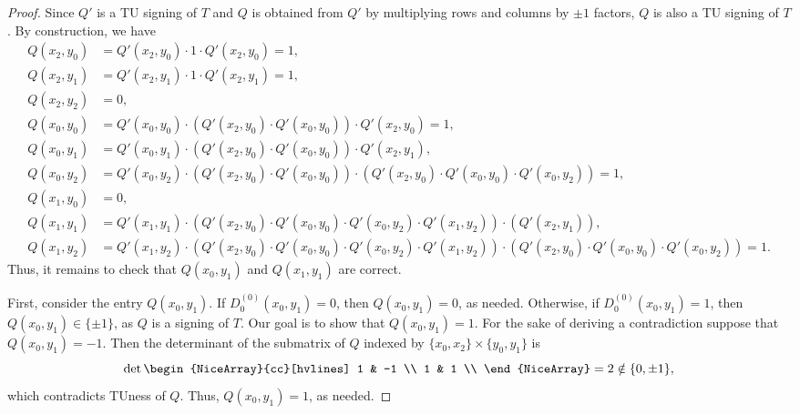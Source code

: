 \documentclass{article}
\theoremstyle{definition}
\begin{document}
\begin{proof}
    Since $Q'$ is a TU signing of $T$ and $Q$ is obtained from $Q'$ by multiplying rows and columns by $\pm 1$ factors, $Q$ is also a TU signing of $T$. By construction, we have
    \begin{align*}
        Q (x_{2}, y_{0}) &= Q' (x_{2}, y_{0}) \cdot 1 \cdot Q' (x_{2}, y_{0}) = 1, \\
        Q (x_{2}, y_{1}) &= Q' (x_{2}, y_{1}) \cdot 1 \cdot Q' (x_{2}, y_{1}) = 1, \\
        Q (x_{2}, y_{2}) &= 0, \\
        Q (x_{0}, y_{0}) &= Q' (x_{0}, y_{0}) \cdot (Q' (x_{2}, y_{0}) \cdot Q' (x_{0}, y_{0})) \cdot Q' (x_{2}, y_{0}) = 1, \\
        Q (x_{0}, y_{1}) &= Q' (x_{0}, y_{1}) \cdot (Q' (x_{2}, y_{0}) \cdot Q' (x_{0}, y_{0})) \cdot Q' (x_{2}, y_{1}), \\
        Q (x_{0}, y_{2}) &= Q' (x_{0}, y_{2}) \cdot (Q' (x_{2}, y_{0}) \cdot Q' (x_{0}, y_{0})) \cdot (Q' (x_{2}, y_{0}) \cdot Q' (x_{0}, y_{0}) \cdot Q' (x_{0}, y_{2})) = 1, \\
        Q (x_{1}, y_{0}) &= 0, \\
        Q (x_{1}, y_{1}) &= Q' (x_{1}, y_{1}) \cdot (Q' (x_{2}, y_{0}) \cdot Q' (x_{0}, y_{0}) \cdot Q' (x_{0}, y_{2}) \cdot Q' (x_{1}, y_{2})) \cdot (Q' (x_{2}, y_{1})), \\
        Q (x_{1}, y_{2}) &= Q' (x_{1}, y_{2}) \cdot (Q' (x_{2}, y_{0}) \cdot Q' (x_{0}, y_{0}) \cdot Q' (x_{0}, y_{2}) \cdot Q' (x_{1}, y_{2})) \cdot (Q' (x_{2}, y_{0}) \cdot Q' (x_{0}, y_{0}) \cdot Q' (x_{0}, y_{2})) = 1.
    \end{align*}
    Thus, it remains to check that $Q (x_{0}, y_{1})$ and $Q (x_{1}, y_{1})$ are correct.

    First, consider the entry $Q (x_{0}, y_{1})$. If $D_{0}^{(0)} (x_{0}, y_{1}) = 0$, then $Q (x_{0}, y_{1}) = 0$, as needed. Otherwise, if $D_{0}^{(0)} (x_{0}, y_{1}) = 1$, then $Q (x_{0}, y_{1}) \in \{\pm 1\}$, as $Q$ is a signing of $T$. Our goal is to show that $Q (x_{0}, y_{1}) = 1$. For the sake of deriving a contradiction suppose that $Q (x_{0}, y_{1}) = -1$. Then the determinant of the submatrix of $Q$ indexed by $\{x_{0}, x_{2}\} \times \{y_{0}, y_{1}\}$ is
    \[
        \det \begin{NiceArray}{cc}[hvlines] 1 & -1 \\ 1 & 1 \\ \end{NiceArray} = 2 \notin \{0, \pm 1\},
    \]
    which contradicts TUness of $Q$. Thus, $Q (x_{0}, y_{1}) = 1$, as needed.


\end{proof}
\end{document}
